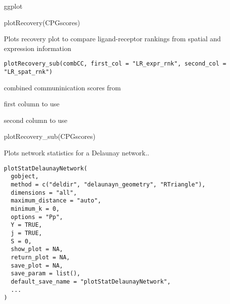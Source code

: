 \documentclass[a4paper]{book}
\begin{document}
%
\begin{Value}
ggplot
\end{Value}
%
\begin{Examples}
\begin{ExampleCode}
    plotRecovery(CPGscores)
\end{ExampleCode}
\end{Examples}
%
\begin{Description}\relax
Plots recovery plot to compare ligand-receptor rankings from spatial and expression information
\end{Description}
%
\begin{Usage}
\begin{verbatim}
plotRecovery_sub(combCC, first_col = "LR_expr_rnk", second_col = "LR_spat_rnk")
\end{verbatim}
\end{Usage}
%
\begin{Arguments}
\begin{ldescription}
\item[\code{combCC}] combined communinication scores from 

\item[\code{first\_col}] first column to use

\item[\code{second\_col}] second column to use
\end{ldescription}
\end{Arguments}
%
\begin{Examples}
\begin{ExampleCode}
    plotRecovery_sub(CPGscores)
\end{ExampleCode}
\end{Examples}
%
\begin{Description}\relax
Plots network statistics for a Delaunay network..
\end{Description}
%
\begin{Usage}
\begin{verbatim}
plotStatDelaunayNetwork(
  gobject,
  method = c("deldir", "delaunayn_geometry", "RTriangle"),
  dimensions = "all",
  maximum_distance = "auto",
  minimum_k = 0,
  options = "Pp",
  Y = TRUE,
  j = TRUE,
  S = 0,
  show_plot = NA,
  return_plot = NA,
  save_plot = NA,
  save_param = list(),
  default_save_name = "plotStatDelaunayNetwork",
  ...
)
\end{verbatim}
\end{Usage}
\end{document}
